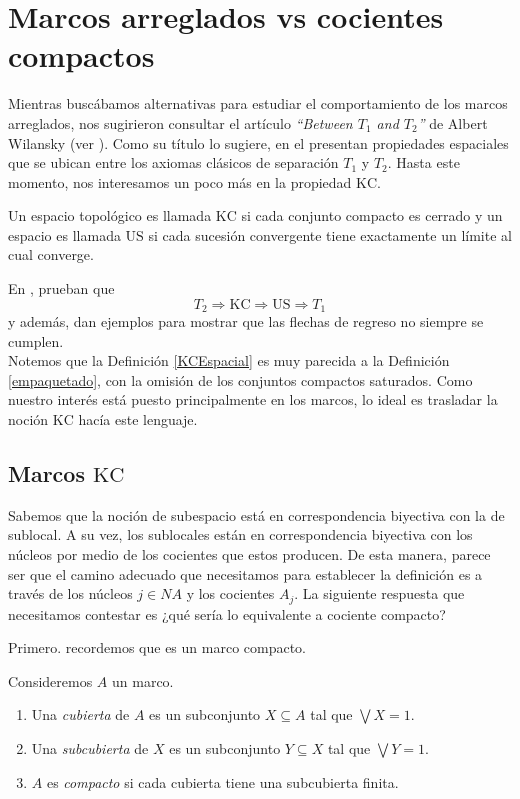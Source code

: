 \chapter{Marcos arreglados vs cocientes compactos}\label{MarcosKC}

Mientras buscábamos alternativas para estudiar el comportamiento de los marcos arreglados, nos sugirieron consultar el artículo \emph{``Between $T_1$ and $T_2$''} de Albert Wilansky (ver \cite{A.W.}). Como su título lo sugiere, en el presentan propiedades espaciales que se ubican 
entre los axiomas clásicos de separación $T_1$ y $T_2$. Hasta este momento, nos interesamos un poco más en la propiedad $\mathrm{KC}$. 

\begin{dfn}\label{KCEspacial}
Un espacio topológico es llamada $\mathrm{KC}$ si cada conjunto compacto es cerrado y un espacio es llamada $\mathrm{US}$ si cada sucesión convergente tiene exactamente un límite al cual converge.
\end{dfn}

En \cite{A.W.}, prueban que 
\[
T_2\Rightarrow \mathrm{KC} \Rightarrow \mathrm{US} \Rightarrow T_1
\]
y además, dan ejemplos para mostrar que las flechas de regreso no siempre se cumplen.\\

Notemos que la Definición \ref{KCEspacial} es muy parecida a la Definición \ref{empaquetado}, con la omisión de los conjuntos compactos saturados. Como nuestro interés está puesto principalmente en los marcos, lo ideal es trasladar 
la noción $\mathrm{KC}$ hacía este lenguaje.

\section{Marcos $\mathrm{KC}$}\label{Marcoskc}
    
Sabemos que la noción de subespacio está en correspondencia biyectiva con la de sublocal. A su vez, los sublocales están en correspondencia biyectiva con los núcleos por medio de los cocientes que estos producen. De esta manera, parece ser que el 
camino adecuado que necesitamos para establecer la definición es a través de los núcleos $j\in NA$ y los cocientes $A_j$. La siguiente respuesta que necesitamos contestar es ¿qué sería lo equivalente a cociente compacto?

Primero. recordemos que es un marco compacto.

\begin{dfn}\label{marcocompacto}
Consideremos $A$ un marco. 
\begin{enumerate}
\item Una \emph{cubierta} de $A$ es un subconjunto $X\subseteq A$ tal que $\bigvee X=1$. 
\item Una \emph{subcubierta} de $X$ es un subconjunto $Y\subseteq X$ tal que $\bigvee Y=1$.
\item $A$ es \emph{compacto} si cada cubierta tiene una subcubierta finita.
\end{enumerate}
\end{dfn}

